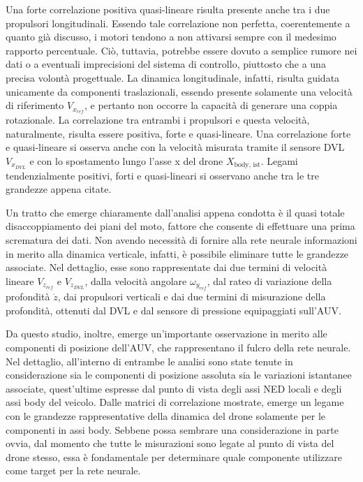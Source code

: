 Una forte correlazione positiva quasi-lineare risulta presente anche tra i due propulsori longitudinali. Essendo tale correlazione non perfetta, coerentemente a quanto già discusso, i motori tendono a non attivarsi sempre con il medesimo rapporto percentuale. Ciò, tuttavia, potrebbe essere dovuto a semplice rumore nei dati o a eventuali imprecisioni del sistema di controllo, piuttosto che a una precisa volontà progettuale. La dinamica longitudinale, infatti, risulta guidata unicamente da componenti traslazionali, essendo presente solamente una velocità di riferimento $V_{x_{ref}}$, e pertanto non occorre la capacità di generare una coppia rotazionale. La correlazione tra entrambi i propulsori e questa velocità, naturalmente, risulta essere positiva, forte e quasi-lineare. Una correlazione forte e quasi-lineare si osserva anche con la velocità misurata tramite il sensore DVL $V_{x_{DVL}}$ e con lo spostamento lungo l'asse x del drone $X_{\text{body, ist}}$. Legami tendenzialmente positivi, forti e quasi-lineari si osservano anche tra le tre grandezze appena citate.  

Un tratto che emerge chiaramente dall'analisi appena condotta è il quasi totale disaccoppiamento dei piani del moto, fattore che consente di effettuare una prima scrematura dei dati. Non avendo necessità di fornire alla rete neurale informazioni in merito alla dinamica verticale, infatti, è possibile eliminare tutte le grandezze associate. Nel dettaglio, esse sono rappresentate dai due termini di velocità lineare $V_{z_{ref}}$ e $V_{z_{DVL}}$, dalla velocità angolare $\omega_{y_{ref}}$, dal rateo di variazione della profondità $\dot{z}$, dai propulsori verticali e dai due termini di misurazione della profondità, ottenuti dal DVL e dal sensore di pressione equipaggiati sull'AUV.

Da questo studio, inoltre, emerge un'importante osservazione in merito alle componenti di posizione dell'AUV, che rappresentano il fulcro della rete neurale. Nel dettaglio, all'interno di entrambe le analisi sono state tenute in considerazione sia le componenti di posizione assoluta sia le variazioni istantanee associate, quest'ultime espresse dal punto di vista degli assi NED locali e degli assi body del veicolo. Dalle matrici di correlazione mostrate, emerge un legame con le grandezze rappresentative della dinamica del drone solamente per le componenti in assi body. Sebbene possa sembrare una considerazione in parte ovvia, dal momento che tutte le misurazioni sono legate al punto di vista del drone stesso, essa è fondamentale per determinare quale componente utilizzare come target per la rete neurale. 


